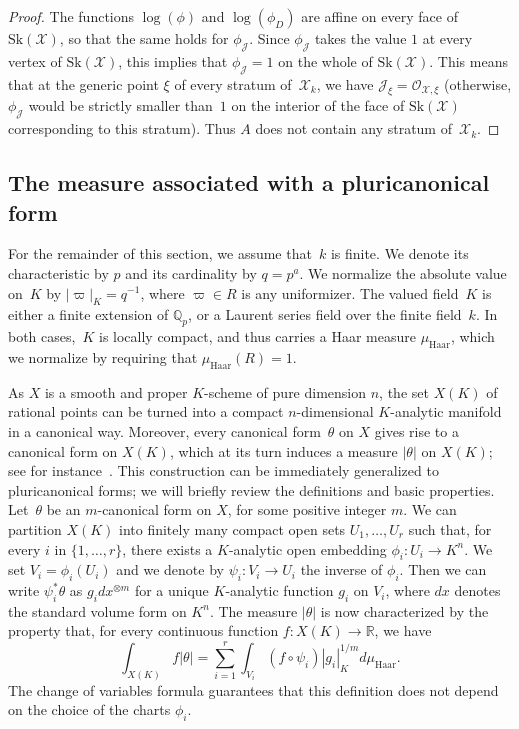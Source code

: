\documentclass[11pt]{article}
\let\mathcal\mathscr
\theoremstyle{definition}
\numberwithin{equation}{subsection}
\newcommand{\Q}{\ensuremath{\mathbb{Q}}}
\newcommand{\R}{\ensuremath{\mathbb{R}}}
\newcommand{\cX}{\ensuremath{\mathscr{X}}}
\newcommand{\Haar}{\mathrm{Haar}}
\newcommand{\Sk}{\mathrm{Sk}}
\let\form\theta
\let\unif\varpi
\begin{document}
\begin{proof}
The functions $\log(\phi)$ and $\log(\phi_D)$ are affine on every face of $\Sk(\cX)$, so that the same holds for $\phi_{\mathscr{J}}$. Since $\phi_{\mathscr{J}}$ takes the value $1$ at every vertex of $\Sk(\cX)$, this implies that $\phi_{\mathscr{J}}=1$ on the whole of $\Sk(\cX)$. This means that at the generic point $\xi$ of every stratum of~$\cX_k$, we have $\mathscr{J}_{\xi}=\mathcal{O}_{\cX,\xi}$ (otherwise, $\phi_{\mathscr{J}}$ would be strictly smaller than~$1$ on the interior of the face of $\Sk(\cX)$ corresponding to this stratum). Thus $A$ does not contain any stratum of~$\cX_k$.
\end{proof}

\subsection{The measure associated with a pluricanonical form}\label{ss:pluri}
For the remainder of this section, we assume that~$k$ is finite. We denote its characteristic by $p$ and its cardinality by $q=p^a$. We normalize the absolute value on~$K$ by $|\unif|_K=q^{-1}$, where $\unif\in R$ is any uniformizer.
The valued field~$K$ is either a finite extension of $\Q_p$, or a Laurent series field over the finite field~$k$. In both cases,~$K$ is locally compact,
and thus carries a Haar measure $\mu_{\Haar}$, which we normalize by requiring that $\mu_{\Haar}(R)=1$.

As $X$ is a smooth and proper $K$\nobreakdash-scheme of pure dimension $n$, the set $X(K)$ of rational points can be turned into a compact $n$-dimensional $K$\nobreakdash-analytic manifold in a canonical way.
Moreover, every canonical form~$\form$ on $X$ gives rise to a canonical form on $X(K)$, which at its turn induces a measure $|\form|$ on $X(K)$; see for instance~\cite[\S1.1]{ChNiSe}. This construction can be immediately generalized to pluricanonical forms; we will briefly review the definitions and basic properties. Let~$\form$ be an $m$-canonical form on $X$, for some positive integer $m$. We can partition $X(K)$ into finitely many compact open sets $U_1,\ldots,U_r$ such that, for every $i$ in $\{1,\ldots,r\}$, there exists a $K$\nobreakdash-analytic open embedding
$\phi_i:U_i\to K^n$. We set $V_i=\phi_i(U_i)$ and we denote by $\psi_i:V_i\to U_i$ the inverse of $\phi_i$. Then we can write $\psi_i^* \form$ as
$g_i dx^{\otimes m}$ for a unique $K$\nobreakdash-analytic function $g_i$ on $V_i$, where $dx$ denotes the standard volume form on $K^n$.
The measure $|\form|$ is now characterized by the property that, for every continuous function $f:X(K)\to \R$, we have
\[
\int_{X(K)} f |\form|=\sum_{i=1}^r \int_{V_i}(f\circ \psi_i)|g_i|^{1/m}_K d\mu_{\Haar}.
\]
The change of variables formula guarantees that this definition does not depend on the choice of the charts $\phi_i$.
\end{document}
